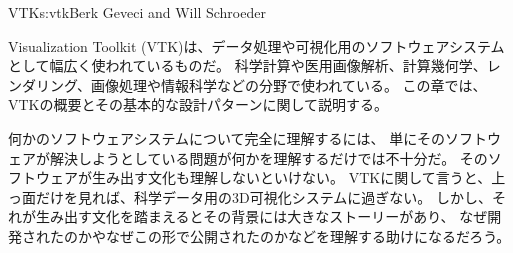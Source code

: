 \begin{aosachapter}{VTK}{s:vtk}{Berk Geveci and Will Schroeder}

Visualization Toolkit (VTK)は、データ処理や可視化用のソフトウェアシステムとして幅広く使われているものだ。
科学計算や医用画像解析、計算幾何学、レンダリング、画像処理や情報科学などの分野で使われている。
この章では、VTKの概要とその基本的な設計パターンに関して説明する。

何かのソフトウェアシステムについて完全に理解するには、
単にそのソフトウェアが解決しようとしている問題が何かを理解するだけでは不十分だ。
そのソフトウェアが生み出す文化も理解しないといけない。
VTKに関して言うと、上っ面だけを見れば、科学データ用の3D可視化システムに過ぎない。
しかし、それが生み出す文化を踏まえるとその背景には大きなストーリーがあり、
なぜ開発されたのかやなぜこの形で公開されたのかなどを理解する助けになるだろう。


\end{aosachapter}
